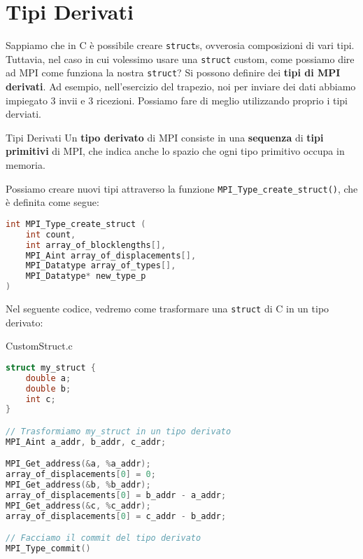 \section{Tipi Derivati}

Sappiamo che in C è possibile creare \verb|struct|s, ovverosia composizioni di vari tipi. Tuttavia, nel caso in cui volessimo usare una \verb|struct| custom, come possiamo dire ad MPI come funziona la nostra \verb|struct|? Si possono definire dei \textbf{tipi di MPI derivati}. Ad esempio, nell'esercizio del trapezio, noi per inviare dei dati abbiamo impiegato 3 invii e 3 ricezioni. Possiamo fare di meglio utilizzando proprio i tipi derviati.

\begin{definition}{Tipi Derivati}
    Un \textbf{tipo derivato} di MPI consiste in una \textbf{sequenza} di \textbf{tipi primitivi} di MPI, che indica anche lo spazio che ogni tipo primitivo occupa in memoria.
\end{definition}

Possiamo creare nuovi tipi attraverso la funzione \verb|MPI_Type_create_struct()|, che è definita come segue:

\begin{codedefine}
    \begin{lstlisting}[language = C, numbers = none]
int MPI_Type_create_struct (
    int count,
    int array_of_blocklengths[],
    MPI_Aint array_of_displacements[],
    MPI_Datatype array_of_types[],
    MPI_Datatype* new_type_p
)\end{lstlisting}
\tcblower
\end{codedefine}

Nel seguente codice, vedremo come trasformare una \verb|struct| di C in un tipo derivato:

\begin{codeblock}{CustomStruct.c}
    \begin{lstlisting}[language = C, numbers = none, columns=fullflexible]
struct my_struct {
    double a;
    double b;
    int c;
}

// Trasformiamo my_struct in un tipo derivato
MPI_Aint a_addr, b_addr, c_addr;

MPI_Get_address(&a, %a_addr);
array_of_displacements[0] = 0;
MPI_Get_address(&b, %b_addr);
array_of_displacements[0] = b_addr - a_addr;
MPI_Get_address(&c, %c_addr);
array_of_displacements[0] = c_addr - b_addr;

// Facciamo il commit del tipo derivato
MPI_Type_commit()
    \end{lstlisting}
\end{codeblock}